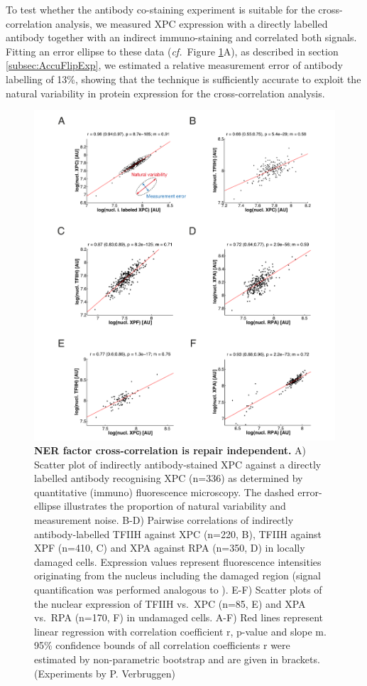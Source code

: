 To test whether the antibody co-staining experiment is suitable for the cross-correlation analysis, we measured XPC expression with a directly labelled antibody together with an indirect immuno-staining and correlated both signals. Fitting an error ellipse to these data (\textit{cf.}\ Figure \ref{fig:coExpressionData}A), as described in section  \ref{subsec:AccuFlipExp}, we estimated a relative measurement error of antibody labelling of 13\%, showing that the technique is sufficiently accurate to exploit the natural variability in protein expression for the cross-correlation analysis.
\begin{figure}[htbp]
	\begin{center}
		\includegraphics[width=1\textwidth]{Abbildungen/figureTAC_2.pdf}
		\caption{\textbf{NER factor cross-correlation is repair independent.} A) Scatter plot of indirectly antibody-stained XPC against a directly labelled antibody recognising XPC (n=336) as determined by quantitative (immuno) fluorescence microscopy. The dashed error-ellipse illustrates the proportion of natural variability and measurement noise. B-D) Pairwise correlations of indirectly antibody-labelled TFIIH against XPC (n=220, B), TFIIH against XPF (n=410, C) and XPA against RPA (n=350, D) in locally damaged cells. Expression values represent fluorescence intensities originating from the nucleus including the damaged region (signal quantification was performed analogous to \cite{Luijsterburg2010}). E-F) Scatter plots of the nuclear expression of TFIIH vs.\ XPC (n=85, E) and XPA vs.\ RPA (n=170, F) in undamaged cells. A-F) Red lines represent linear regression with correlation coefficient r, p-value and slope m. 95\% confidence bounds of all correlation coefficients r were estimated by non-parametric bootstrap and are given in brackets. (Experiments by P. Verbruggen)}
		\label{fig:coExpressionData}
	\end{center}
\end{figure}

